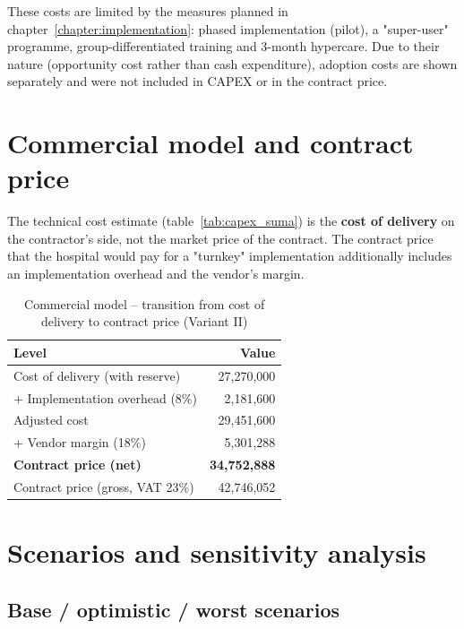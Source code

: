 These costs are limited by the measures planned in chapter~\ref{chapter:implementation}: phased implementation (pilot), a "super-user" programme, group-differentiated training and 3-month hypercare. Due to their nature (opportunity cost rather than cash expenditure), adoption costs are shown separately and were not included in CAPEX or in the contract price.

\section{Commercial model and contract price}

The technical cost estimate (table~\ref{tab:capex_suma}) is the \textbf{cost of delivery} on the contractor's side, not the market price of the contract. The contract price that the hospital would pay for a "turnkey" implementation additionally includes an implementation overhead and the vendor's margin.

\begin{table}[h]
\centering
\small
\renewcommand{\arraystretch}{1.2}
\begin{tabular}{|L{8.5cm}|r|}
\hline
{}\textbf{Level} & \textbf{Value} \\
\hline
Cost of delivery (with reserve) & 27,270,000 \\
\hline
+ Implementation overhead (8\%) & 2,181,600 \\
\hline
Adjusted cost & 29,451,600 \\
\hline
+ Vendor margin (18\%) & 5,301,288 \\
\hline
{}\textbf{Contract price (net)} & \textbf{34,752,888} \\
\hline
Contract price (gross, VAT 23\%) & 42,746,052 \\
\hline
\end{tabular}
\caption{Commercial model -- transition from cost of delivery to contract price (Variant II)}
\label{tab:komercyjny}
\end{table}

\section{Scenarios and sensitivity analysis}

\subsection{Base / optimistic / worst scenarios}

